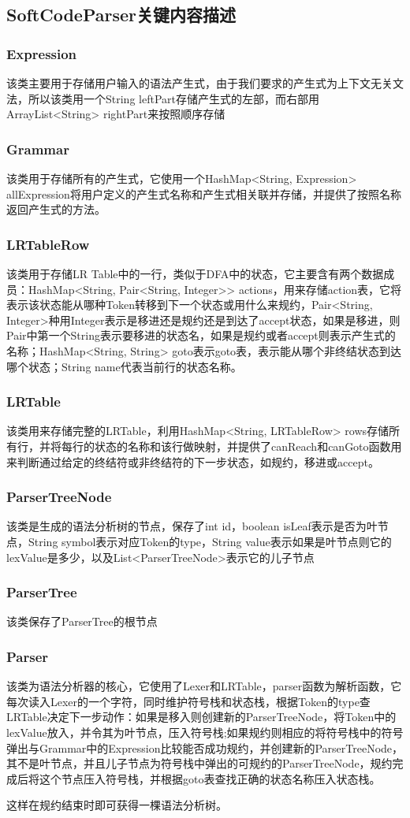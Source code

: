 \subsection{SoftCodeParser关键内容描述}
\subsubsection{Expression}
该类主要用于存储用户输入的语法产生式，由于我们要求的产生式为上下文无关文法，所以该类用一个String leftPart存储产生式的左部，而右部用ArrayList<String> rightPart来按照顺序存储
\subsubsection{Grammar}
该类用于存储所有的产生式，它使用一个HashMap<String, Expression> allExpression将用户定义的产生式名称和产生式相关联并存储，并提供了按照名称返回产生式的方法。
\subsubsection{LRTableRow}
该类用于存储LR Table中的一行，类似于DFA中的状态，它主要含有两个数据成员：HashMap<String, Pair<String, Integer>> actions，用来存储action表，它将表示该状态能从哪种Token转移到下一个状态或用什么来规约，Pair<String, Integer>种用Integer表示是移进还是规约还是到达了accept状态，如果是移进，则Pair中第一个String表示要移进的状态名，如果是规约或者accept则表示产生式的名称；HashMap<String, String> goto表示goto表，表示能从哪个非终结状态到达哪个状态；String name代表当前行的状态名称。
\subsubsection{LRTable}
该类用来存储完整的LRTable，利用HashMap<String, LRTableRow> rows存储所有行，并将每行的状态的名称和该行做映射，并提供了canReach和canGoto函数用来判断通过给定的终结符或非终结符的下一步状态，如规约，移进或accept。
\subsubsection{ParserTreeNode}
该类是生成的语法分析树的节点，保存了int id，boolean isLeaf表示是否为叶节点，String symbol表示对应Token的type，String value表示如果是叶节点则它的lexValue是多少，以及List<ParserTreeNode>表示它的儿子节点
\subsubsection{ParserTree}
该类保存了ParserTree的根节点
\subsubsection{Parser}
该类为语法分析器的核心，它使用了Lexer和LRTable，parser函数为解析函数，它每次读入Lexer的一个字符，同时维护符号栈和状态栈，根据Token的type查LRTable决定下一步动作：如果是移入则创建新的ParserTreeNode，将Token中的lexValue放入，并令其为叶节点，压入符号栈;如果规约则相应的将符号栈中的符号弹出与Grammar中的Expression比较能否成功规约，并创建新的ParserTreeNode，其不是叶节点，并且儿子节点为符号栈中弹出的可规约的ParserTreeNode，规约完成后将这个节点压入符号栈，并根据goto表查找正确的状态名称压入状态栈。


这样在规约结束时即可获得一棵语法分析树。